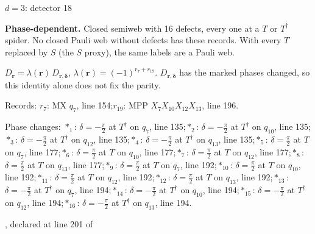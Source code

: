 \label{d3_det018}
{\Large $d=3$: detector 18}\par
\textbf{Phase-dependent.} Closed semiweb with 16 defects, every one at a $T$ or $T^\dagger$ spider. No closed Pauli web without defects has these records. With every $T$ replaced by $S$ (the $S$ proxy), the same labels are a Pauli web.
\begin{center}
\end{center}
\vspace{-1mm}
$D_{\boldsymbol r}=\lambda(\boldsymbol r)\,D_{\boldsymbol r,\boldsymbol\delta}$, \quad $\lambda(\boldsymbol r)=(-1)^{r_{7}+r_{19}}$. \qquad $D_{\boldsymbol r,\boldsymbol\delta}$ has the marked phases changed, so this identity alone does not fix the parity.
\par\smallskip\begin{minipage}{.98\linewidth}\small Records: $r_{7}$: MX $q_{7}$, line 154;\quad $r_{19}$: MPP $X_{7}X_{10}X_{12}X_{13}$, line 196.\end{minipage}
\par\smallskip\begin{minipage}{.98\linewidth}\small Phase changes: $\ast_{1}$: $\delta=-\frac{\pi}{2}$ at $T^\dagger$ on $q_{7}$, line 135;\quad $\ast_{2}$: $\delta=-\frac{\pi}{2}$ at $T^\dagger$ on $q_{10}$, line 135;\quad $\ast_{3}$: $\delta=-\frac{\pi}{2}$ at $T^\dagger$ on $q_{12}$, line 135;\quad $\ast_{4}$: $\delta=-\frac{\pi}{2}$ at $T^\dagger$ on $q_{13}$, line 135;\quad $\ast_{5}$: $\delta=\frac{\pi}{2}$ at $T$ on $q_{7}$, line 177;\quad $\ast_{6}$: $\delta=\frac{\pi}{2}$ at $T$ on $q_{10}$, line 177;\quad $\ast_{7}$: $\delta=\frac{\pi}{2}$ at $T$ on $q_{12}$, line 177;\quad $\ast_{8}$: $\delta=\frac{\pi}{2}$ at $T$ on $q_{13}$, line 177;\quad $\ast_{9}$: $\delta=\frac{\pi}{2}$ at $T$ on $q_{7}$, line 192;\quad $\ast_{10}$: $\delta=\frac{\pi}{2}$ at $T$ on $q_{10}$, line 192;\quad $\ast_{11}$: $\delta=\frac{\pi}{2}$ at $T$ on $q_{12}$, line 192;\quad $\ast_{12}$: $\delta=\frac{\pi}{2}$ at $T$ on $q_{13}$, line 192;\quad $\ast_{13}$: $\delta=-\frac{\pi}{2}$ at $T^\dagger$ on $q_{7}$, line 194;\quad $\ast_{14}$: $\delta=-\frac{\pi}{2}$ at $T^\dagger$ on $q_{10}$, line 194;\quad $\ast_{15}$: $\delta=-\frac{\pi}{2}$ at $T^\dagger$ on $q_{12}$, line 194;\quad $\ast_{16}$: $\delta=-\frac{\pi}{2}$ at $T^\dagger$ on $q_{13}$, line 194.\end{minipage}
\vfill
{\footnotesize\texttt{}, declared at line 201 of \texttt{}}
\newpage

